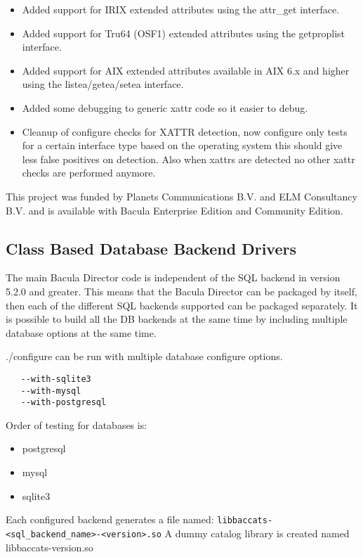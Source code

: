 \begin{itemize}
\item Added support for IRIX extended attributes using the attr\_get interface.
\item Added support for Tru64 (OSF1) extended attributes using the
  getproplist interface.
\item Added support for AIX extended attributes available in AIX 6.x
  and higher using the listea/getea/setea interface.
\item Added some debugging to generic xattr code so it easier to
  debug.
\item Cleanup of configure checks for XATTR detection, now configure only
  tests for a certain interface type based on the operating system
  this should give less false positives on detection. Also when xattrs
  are detected no other xattr checks are performed anymore.
\end{itemize}

\medskip
This project was funded by Planets Communications B.V. and ELM Consultancy B.V.
and is available with Bacula Enterprise Edition and Community Edition.

\subsection{Class Based Database Backend Drivers}

The main Bacula Director code is independent of the SQL backend
in version 5.2.0 and greater.  This means that the Bacula Director can be
packaged by itself, then each of the different SQL backends supported can
be packaged separately.  It is possible to build all the DB backends at the
same time by including multiple database options at the same time.

./configure can be run with multiple database configure options.
\begin{verbatim}
   --with-sqlite3
   --with-mysql
   --with-postgresql
\end{verbatim}

Order of testing for databases is:
\begin{itemize}
\item postgresql
\item mysql
\item sqlite3
\end{itemize}

Each configured backend generates a file named:
\verb+libbaccats-<sql_backend_name>-<version>.so+
A dummy catalog library is created named libbaccats-version.so

